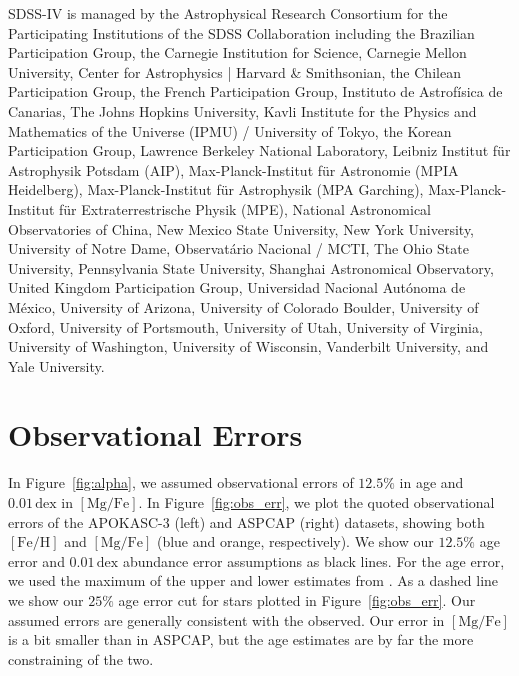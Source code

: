 \documentclass[twocolumn,linenumbers]{aastex631}
\newcommand{\FeH}{\ensuremath{[\textrm{Fe}/\textrm{H}]}}
\newcommand{\MgFe}{\ensuremath{[\textrm{Mg}/\textrm{Fe}]}}
\newcommand{\dex}{\ensuremath{\textrm{dex}}}
\begin{document}
\begin{acknowledgements}
  SDSS-IV is managed by the 
  Astrophysical Research Consortium 
  for the Participating Institutions 
  of the SDSS Collaboration including 
  the Brazilian Participation Group, 
  the Carnegie Institution for Science, 
  Carnegie Mellon University, Center for 
  Astrophysics | Harvard \& 
  Smithsonian, the Chilean Participation 
  Group, the French Participation Group, 
  Instituto de Astrof\'isica de 
  Canarias, The Johns Hopkins 
  University, Kavli Institute for the 
  Physics and Mathematics of the 
  Universe (IPMU) / University of 
  Tokyo, the Korean Participation Group, 
  Lawrence Berkeley National Laboratory, 
  Leibniz Institut f\"ur Astrophysik 
  Potsdam (AIP),  Max-Planck-Institut 
  f\"ur Astronomie (MPIA Heidelberg), 
  Max-Planck-Institut f\"ur 
  Astrophysik (MPA Garching), 
  Max-Planck-Institut f\"ur 
  Extraterrestrische Physik (MPE), 
  National Astronomical Observatories of 
  China, New Mexico State University, 
  New York University, University of 
  Notre Dame, Observat\'ario 
  Nacional / MCTI, The Ohio State 
  University, Pennsylvania State 
  University, Shanghai 
  Astronomical Observatory, United 
  Kingdom Participation Group, 
  Universidad Nacional Aut\'onoma 
  de M\'exico, University of Arizona, 
  University of Colorado Boulder, 
  University of Oxford, University of 
  Portsmouth, University of Utah, 
  University of Virginia, University 
  of Washington, University of 
  Wisconsin, Vanderbilt University, 
  and Yale University.


\end{acknowledgements}

{}


\appendix

\section{Observational Errors}\label{app:obs_err}
In Figure~\ref{fig:alpha}, we assumed observational errors of $12.5\%$ in age and $0.01\,\dex$ in \MgFe{}. In Figure~\ref{fig:obs_err}, we plot the quoted observational errors of the APOKASC-3 (left) and ASPCAP (right) datasets, showing both \FeH{} and \MgFe{} (blue and orange, respectively). We show our $12.5\%$ age error and $0.01\,\dex$ abundance error assumptions as black lines. For the age error, we used the maximum of the upper and lower estimates from \citet{2018ApJS..239...32P}. As a dashed line we show our $25\%$ age error cut for stars plotted in Figure~\ref{fig:obs_err}. Our assumed errors are generally consistent with the observed. Our error in \MgFe{} is a bit smaller than in ASPCAP, but the age estimates are by far the more constraining of the two.
\end{document}
